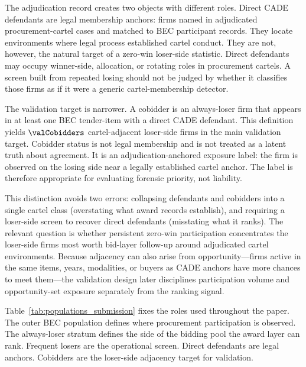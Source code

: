 The adjudication record creates two objects with different
roles. Direct CADE defendants are legal membership anchors:
firms named in adjudicated procurement-cartel cases and matched
to BEC participant records. They locate environments where legal
process established cartel conduct. They are not,
however, the natural target of a zero-win loser-side statistic.
Direct defendants may occupy winner-side, allocation, or
rotating roles in procurement cartels. A screen built from
repeated losing should not be judged by whether it classifies
those firms as if it were a generic cartel-membership detector.

The validation target is narrower. A cobidder is an always-loser
firm that appears in at least one BEC tender-item with a direct
CADE defendant. This definition yields $\valCobidders$
cartel-adjacent loser-side firms in the main validation target.
Cobidder status is not legal membership and is not treated as a
latent truth about agreement. It is an adjudication-anchored
exposure label: the firm is observed on the losing side near a
legally established cartel anchor. The label is therefore
appropriate for evaluating forensic priority, not liability.

This distinction avoids two errors: collapsing defendants and
cobidders into a single cartel class (overstating what award
records establish), and requiring a loser-side screen to recover
direct defendants (misstating what it ranks). The relevant
question is whether persistent zero-win participation concentrates
the loser-side firms most worth bid-layer follow-up around
adjudicated cartel environments. Because adjacency can also arise
from opportunity---firms active in the same items, years,
modalities, or buyers as CADE anchors have more chances to meet
them---the validation design later disciplines participation
volume and opportunity-set exposure separately from the ranking
signal.

Table~\ref{tab:populations_submission} fixes the roles used throughout
the paper. The outer BEC population defines where procurement
participation is observed. The always-loser stratum defines the
side of the bidding pool the award layer can rank. Frequent
losers are the operational screen. Direct defendants are legal
anchors. Cobidders are the loser-side adjacency target for
validation.

